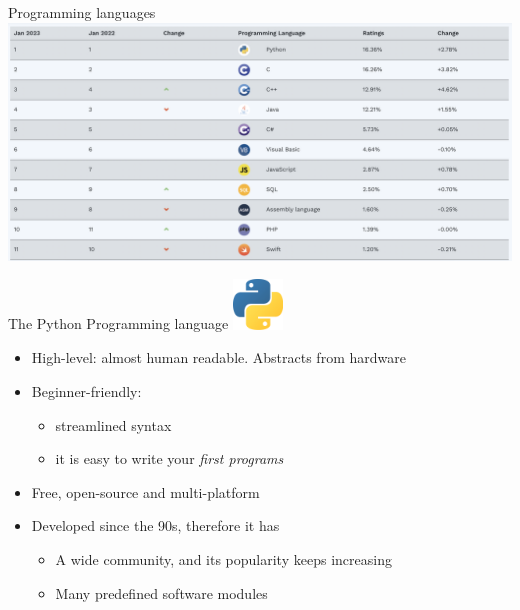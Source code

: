 \documentclass{beamer}%
\begin{document}
\begin{frame}{Programming languages}
		\centering
	{\scriptsize{}}
	\includegraphics[scale=0.24]{figures/tiobe01_23.png}\\
\end{frame}


\begin{frame}{The Python Programming language}
	\centering
	\includegraphics[width=0.1\textwidth]{figures/python-logo}
	
	\begin{itemize}
		\item High-level: almost human readable. Abstracts from hardware
		\item Beginner-friendly: 
		\begin{itemize}
			\item streamlined syntax
			\item it is easy to write your \emph{first programs}
		\end{itemize}	
		\item Free, open-source and multi-platform
		\item Developed since the 90s, therefore it has 
		\begin{itemize}
			\item A wide community, and its popularity keeps increasing
			\item Many predefined software modules
		\end{itemize}
	\end{itemize}
\end{frame}
\end{document}
